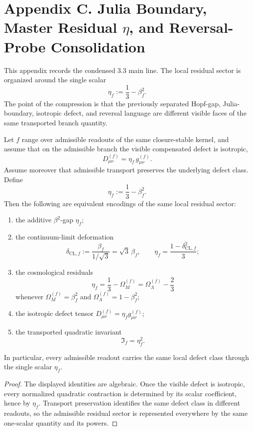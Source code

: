 \section*{Appendix C. Julia Boundary, Master Residual $\eta$, and Reversal-Probe Consolidation}

This appendix records the condensed 3.3 main line. The local residual sector is organized around the single scalar
\[
  \eta_f:=\frac13-\beta_f^2.
\]
The point of the compression is that the previously separated Hopf-gap, Julia-boundary, isotropic defect, and reversal language are different visible faces of the same transported branch quantity.

\begin{proposition}
\label{lem:defect-transport}
\label{prop:master-defect-scalar}
Let $f$ range over admissible readouts of the same closure-stable kernel, and assume that on the admissible branch the visible compensated defect is isotropic,
\[
  D^{(f)}_{\mu\nu}=\eta_f\,g^{(f)}_{\mu\nu}.
\]
Assume moreover that admissible transport preserves the underlying defect class. Define
\[
  \eta_f:=\frac13-\beta_f^2.
\]
Then the following are equivalent encodings of the same local residual sector:
\begin{enumerate}[label=(\roman*)]
  \item the additive $\beta^2$-gap $\eta_f$;
  \item the continuum-limit deformation
  \[
    \delta_{\mathrm{CL},f}:=\frac{\beta_f}{1/\sqrt3}=\sqrt3\,\beta_f,
    \qquad
    \eta_f=\frac{1-\delta_{\mathrm{CL},f}^2}{3};
  \]
  \item the cosmological residuals
  \[
    \eta_f=\frac13-\Omega_M^{(f)}=\Omega_\Lambda^{(f)}-\frac23
  \]
  whenever $\Omega_M^{(f)}=\beta_f^2$ and $\Omega_\Lambda^{(f)}=1-\beta_f^2$;
  \item the isotropic defect tensor $D^{(f)}_{\mu\nu}=\eta_f g^{(f)}_{\mu\nu}$;
  \item the transported quadratic invariant
  \[
    \mathfrak I_f=\eta_f^2.
  \]
\end{enumerate}
In particular, every admissible readout carries the same local defect class through the single scalar $\eta_f$.
\end{proposition}

\begin{proof}
The displayed identities are algebraic. Once the visible defect is isotropic, every normalized quadratic contraction is determined by its scalar coefficient, hence by $\eta_f$. Transport preservation identifies the same defect class in different readouts, so the admissible residual sector is represented everywhere by the same one-scalar quantity and its powers.
\end{proof}

